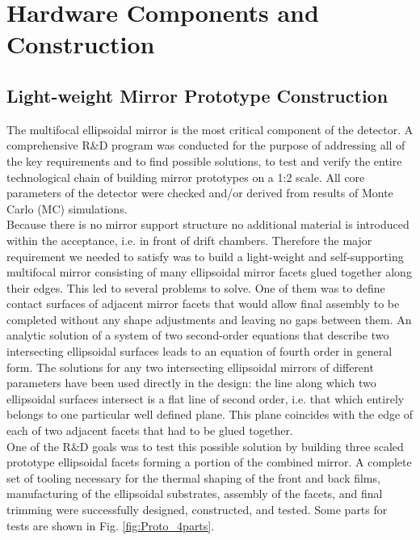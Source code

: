 \section{Hardware Components and Construction}
\subsection{Light-weight Mirror Prototype Construction}
The multifocal ellipsoidal mirror is the most critical component of the detector. A comprehensive R$\&$D program was conducted for the purpose of addressing all of the key requirements and to find possible solutions, to test and verify the entire technological chain of building mirror prototypes on a 1:2 scale. All core parameters of the detector were checked and/or derived from results of Monte Carlo (MC) simulations. \\
\indent Because there is no mirror support structure no additional material is introduced  within the acceptance, i.e. in front of drift chambers. Therefore the major requirement we needed to satisfy was to build a light-weight and self-supporting multifocal mirror consisting of many ellipsoidal mirror facets glued together along their edges. This led to several problems to solve. One of them was to define contact surfaces of adjacent mirror facets that would allow final assembly to be completed without any shape adjustments and leaving no gaps between them. An analytic solution of a system of two second-order equations that describe two intersecting ellipsoidal surfaces leads to an equation of fourth order in general form. The solutions for any two intersecting ellipsoidal mirrors of different parameters have been used directly in the design: the line along which two ellipsoidal surfaces intersect is a flat line of second order, i.e. that which entirely belongs to one particular well defined plane. This plane coincides with the edge of each of two adjacent facets that had to be glued together.  
\\
\indent One of the R$\&$D goals was to test this possible solution by building three scaled prototype ellipsoidal facets forming a portion of the combined mirror. A complete set of tooling necessary for the thermal shaping of the front and back films, manufacturing of the ellipsoidal substrates, assembly of the facets, and final trimming were successfully designed, constructed, and tested. Some parts for tests are shown in Fig. \ref{fig:Proto_4parts}.

